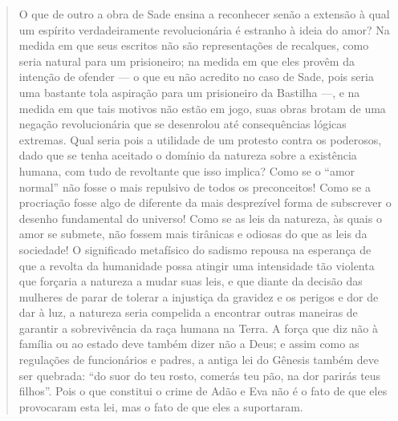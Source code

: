 \begin{quote} %
O que de outro a obra de Sade ensina a reconhecer senão a extensão à qual um espírito verdadeiramente revolucionária é estranho à ideia do amor? Na medida em que seus escritos não são representações de recalques, como seria natural para um prisioneiro; na medida em que eles provêm da intenção de ofender --- o que eu não acredito no caso de Sade, pois seria uma bastante tola aspiração para um prisioneiro da Bastilha ---, e na medida em que tais motivos não estão em jogo, suas obras brotam de uma negação revolucionária que se desenrolou até consequências lógicas extremas. Qual seria pois a utilidade de um protesto contra os poderosos, dado que se tenha aceitado o domínio da natureza sobre a existência humana, com tudo de revoltante que isso implica? Como se o ``amor normal'' não fosse o mais repulsivo de todos os preconceitos! Como se a procriação fosse algo de diferente da mais desprezível forma de subscrever o desenho fundamental do universo! Como se as leis da natureza, às quais o amor se submete, não fossem mais tirânicas e odiosas do que as leis da sociedade! O significado metafísico do sadismo repousa na esperança de que a revolta da humanidade possa atingir uma intensidade tão violenta que forçaria a natureza a mudar suas leis, e que diante da decisão das mulheres de parar de tolerar a injustiça da gravidez e os perigos e dor de dar à luz, a natureza seria compelida a encontrar outras maneiras de garantir a sobrevivência da raça humana na Terra. A força que diz não à família ou ao estado deve também dizer não a Deus; e assim como as regulações de funcionários e padres, a antiga lei do Gênesis também deve ser quebrada: ``do suor do teu rosto, comerás teu pão, na dor parirás teus filhos''. Pois o que constitui o crime de Adão e Eva não é o fato de que eles provocaram esta lei, mas o fato de que eles a suportaram. 
\end{quote}

